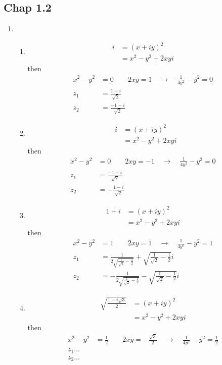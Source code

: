 \documentclass[../main.tex]{subfiles}
\begin{document}
\subsection{Chap 1.2}
\begin{enumerate}
\item \begin{enumerate}
\item
\begin{align}
i&=(x+iy)^2\\
&=x^2-y^2+2xyi
\end{align}
then
\begin{align}
x^2-y^2&=0\qquad 2xy=1\quad\rightarrow\quad\frac{1}{4y^2}-y^2=0\\
z_1&=\frac{1+i}{\sqrt{2}}\\
z_2&=\frac{-1-i}{\sqrt{2}}
\end{align}

\item
\begin{align}
-i&=(x+iy)^2\\
&=x^2-y^2+2xyi
\end{align}
then
\begin{align}
x^2-y^2&=0\qquad 2xy=-1\quad\rightarrow\quad\frac{1}{4y^2}-y^2=0\\
z_1&=\frac{-1+i}{\sqrt{2}}\\
z_2&=-\frac{1-i}{\sqrt{2}}
\end{align}

\item
\begin{align}
1+i&=(x+iy)^2\\
&=x^2-y^2+2xyi
\end{align}
then
\begin{align}
x^2-y^2&=1\qquad 2xy=1\quad\rightarrow\quad\frac{1}{4y^2}-y^2=1\\
z_1&=\frac{1}{2\sqrt{\frac{1}{\sqrt{2}}-\frac{1}{2}}}+\sqrt{\frac{1}{\sqrt{2}}-\frac{1}{2}}i\\
z_2&=-\frac{1}{2\sqrt{\frac{1}{\sqrt{2}}-\frac{1}{2}}}-\sqrt{\frac{1}{\sqrt{2}}-\frac{1}{2}}i
\end{align}

\item
\begin{align}
\sqrt{\frac{1-i\sqrt{3}}{2}}&=(x+iy)^2\\
&=x^2-y^2+2xyi
\end{align}
then
\begin{align}
x^2-y^2&=\frac{1}{2}\qquad 2xy=-\frac{\sqrt{3}}{2}\quad\rightarrow\quad\frac{1}{4y^2}-y^2=\frac{1}{2}\\
z_1...\\
z_2...
\end{align}

\end{enumerate}
\end{enumerate}
\end{document}
